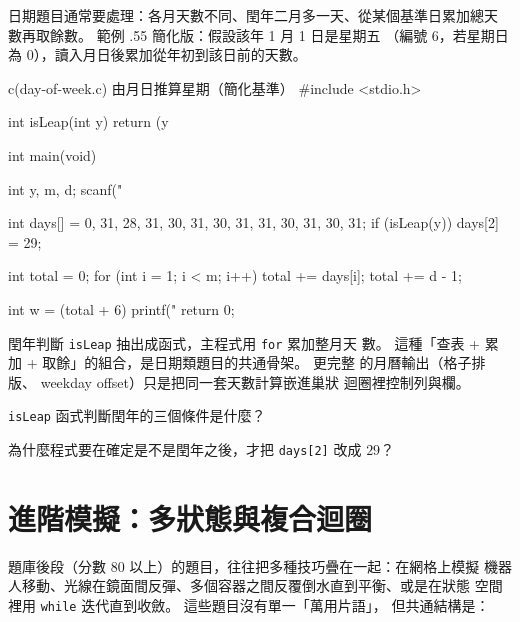 日期題目通常要處理：各月天數不同、閏年二月多一天、從某個基準日累加總天
數再取餘數。 範例 \thechapter.55 簡化版：假設該年 1 月 1 日是星期五
（編號 $6$，若星期日為 $0$），讀入月日後累加從年初到該日前的天數。

\begin{example}{c}{(day-of-week.c) 由月日推算星期（簡化基準）}
#include <stdio.h>

int isLeap(int y) {
    return (y %
}

int main(void) {
    int y, m, d;
    scanf("%

    int days[] = {0, 31, 28, 31, 30, 31, 30, 31, 31, 30, 31, 30, 31};
    if (isLeap(y)) {
        days[2] = 29;
    }

    int total = 0;
    for (int i = 1; i < m; i++) {
        total += days[i];
    }
    total += d - 1;

    int w = (total + 6) %
    printf("%
    return 0;
}
\end{example}


閏年判斷 \texttt{isLeap} 抽出成函式，主程式用 \texttt{for} 累加整月天
數。 這種「查表 + 累加 + 取餘」的組合，是日期類題目的共通骨架。 更完整
的月曆輸出（格子排版、 weekday offset）只是把同一套天數計算嵌進巢狀
迴圈裡控制列與欄。


\begin{drills}[label=drills:loop-day-of-week]
\item \texttt{isLeap} 函式判斷閏年的三個條件是什麼？
\item 為什麼程式要在確定是不是閏年之後，才把 \texttt{days[2]} 改成
$29$？
\end{drills}

\section{進階模擬：多狀態與複合迴圈}
\label{sec:loop-advanced-sim}

題庫後段（分數 $80$ 以上）的題目，往往把多種技巧疊在一起：在網格上模擬
機器人移動、光線在鏡面間反彈、多個容器之間反覆倒水直到平衡、或是在狀態
空間裡用 \texttt{while} 迭代直到收斂。 這些題目沒有單一「萬用片語」，
但共通結構是：

